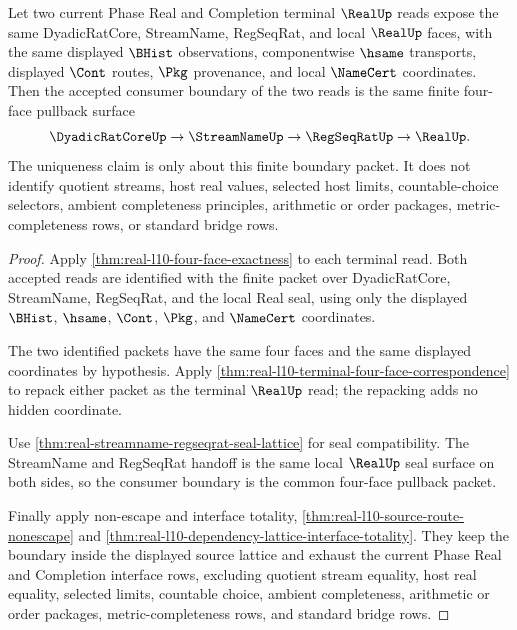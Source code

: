 \begin{theorem}
\label{thm:real-l10-terminal-pullback-uniqueness}
Let two current Phase Real and Completion terminal $\RealUp$ reads expose the same DyadicRatCore, StreamName, RegSeqRat, and local $\RealUp$ faces, with the same displayed $\BHist$ observations, componentwise $\hsame$ transports, displayed $\Cont$ routes, $\Pkg$ provenance, and local $\NameCert$ coordinates. Then the accepted consumer boundary of the two reads is the same finite four-face pullback surface
$$
\DyadicRatCoreUp \to \StreamNameUp \to \RegSeqRatUp \to \RealUp.
$$
The uniqueness claim is only about this finite boundary packet. It does not identify quotient streams, host real values, selected host limits, countable-choice selectors, ambient completeness principles, arithmetic or order packages, metric-completeness rows, or standard bridge rows.
\end{theorem}
\begin{proof}
Apply \autoref{thm:real-l10-four-face-exactness} to each terminal read. Both accepted reads are identified with the finite packet over DyadicRatCore, StreamName, RegSeqRat, and the local Real seal, using only the displayed $\BHist$, $\hsame$, $\Cont$, $\Pkg$, and $\NameCert$ coordinates.

The two identified packets have the same four faces and the same displayed coordinates by hypothesis. Apply \autoref{thm:real-l10-terminal-four-face-correspondence} to repack either packet as the terminal $\RealUp$ read; the repacking adds no hidden coordinate.

Use \autoref{thm:real-streamname-regseqrat-seal-lattice} for seal compatibility. The StreamName and RegSeqRat handoff is the same local $\RealUp$ seal surface on both sides, so the consumer boundary is the common four-face pullback packet.

Finally apply non-escape and interface totality, \autoref{thm:real-l10-source-route-nonescape} and \autoref{thm:real-l10-dependency-lattice-interface-totality}. They keep the boundary inside the displayed source lattice and exhaust the current Phase Real and Completion interface rows, excluding quotient stream equality, host real equality, selected limits, countable choice, ambient completeness, arithmetic or order packages, metric-completeness rows, and standard bridge rows.
\end{proof}

